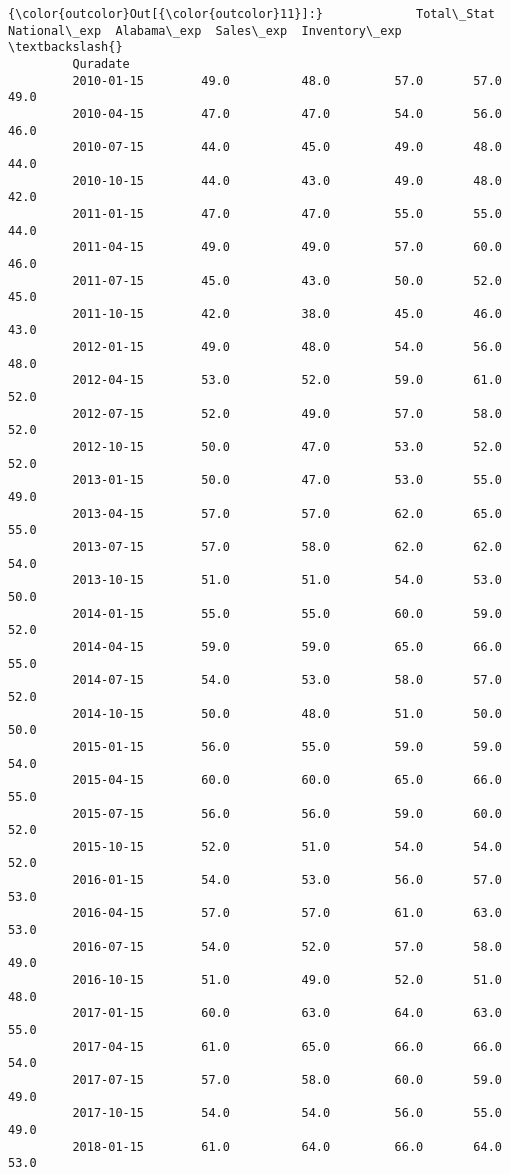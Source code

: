 \documentclass[11pt]{article}
\begin{document}
\begin{Verbatim}[commandchars=\\\{\}]
{\color{outcolor}Out[{\color{outcolor}11}]:}             Total\_Stat  National\_exp  Alabama\_exp  Sales\_exp  Inventory\_exp  \textbackslash{}
         Quradate                                                                      
         2010-01-15        49.0          48.0         57.0       57.0           49.0   
         2010-04-15        47.0          47.0         54.0       56.0           46.0   
         2010-07-15        44.0          45.0         49.0       48.0           44.0   
         2010-10-15        44.0          43.0         49.0       48.0           42.0   
         2011-01-15        47.0          47.0         55.0       55.0           44.0   
         2011-04-15        49.0          49.0         57.0       60.0           46.0   
         2011-07-15        45.0          43.0         50.0       52.0           45.0   
         2011-10-15        42.0          38.0         45.0       46.0           43.0   
         2012-01-15        49.0          48.0         54.0       56.0           48.0   
         2012-04-15        53.0          52.0         59.0       61.0           52.0   
         2012-07-15        52.0          49.0         57.0       58.0           52.0   
         2012-10-15        50.0          47.0         53.0       52.0           52.0   
         2013-01-15        50.0          47.0         53.0       55.0           49.0   
         2013-04-15        57.0          57.0         62.0       65.0           55.0   
         2013-07-15        57.0          58.0         62.0       62.0           54.0   
         2013-10-15        51.0          51.0         54.0       53.0           50.0   
         2014-01-15        55.0          55.0         60.0       59.0           52.0   
         2014-04-15        59.0          59.0         65.0       66.0           55.0   
         2014-07-15        54.0          53.0         58.0       57.0           52.0   
         2014-10-15        50.0          48.0         51.0       50.0           50.0   
         2015-01-15        56.0          55.0         59.0       59.0           54.0   
         2015-04-15        60.0          60.0         65.0       66.0           55.0   
         2015-07-15        56.0          56.0         59.0       60.0           52.0   
         2015-10-15        52.0          51.0         54.0       54.0           52.0   
         2016-01-15        54.0          53.0         56.0       57.0           53.0   
         2016-04-15        57.0          57.0         61.0       63.0           53.0   
         2016-07-15        54.0          52.0         57.0       58.0           49.0   
         2016-10-15        51.0          49.0         52.0       51.0           48.0   
         2017-01-15        60.0          63.0         64.0       63.0           55.0   
         2017-04-15        61.0          65.0         66.0       66.0           54.0   
         2017-07-15        57.0          58.0         60.0       59.0           49.0   
         2017-10-15        54.0          54.0         56.0       55.0           49.0   
         2018-01-15        61.0          64.0         66.0       64.0           53.0   
         

\end{Verbatim}
\end{document}
